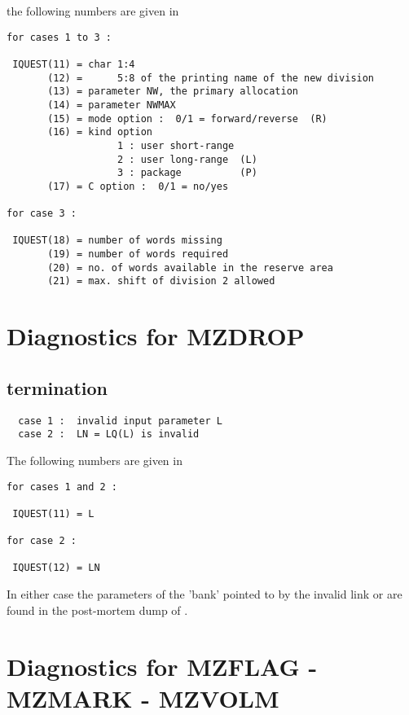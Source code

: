 the following numbers are given in 

\begin{verbatim}
for cases 1 to 3 :

 IQUEST(11) = char 1:4
       (12) =      5:8 of the printing name of the new division
       (13) = parameter NW, the primary allocation
       (14) = parameter NWMAX
       (15) = mode option :  0/1 = forward/reverse  (R)
       (16) = kind option
                   1 : user short-range
                   2 : user long-range  (L)
                   3 : package          (P)
       (17) = C option :  0/1 = no/yes

for case 3 :

 IQUEST(18) = number of words missing
       (19) = number of words required
       (20) = no. of words available in the reserve area
       (21) = max. shift of division 2 allowed
\end{verbatim}

\section{Diagnostics for MZDROP}


\subsection*{ termination}

\begin{verbatim}
  case 1 :  invalid input parameter L
  case 2 :  LN = LQ(L) is invalid
\end{verbatim}

The following numbers are given in 

\begin{verbatim}
for cases 1 and 2 :

 IQUEST(11) = L

for case 2 :

 IQUEST(12) = LN
\end{verbatim}

In either case the parameters of the 'bank' pointed to by the
invalid link  or  are found in the 
post-mortem dump of .

\section{Diagnostics for MZFLAG - MZMARK - MZVOLM}


